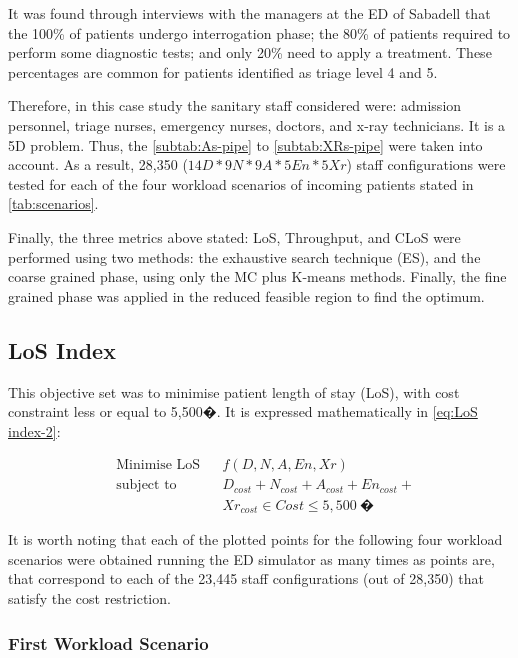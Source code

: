 It was found through interviews with the managers at the ED of Sabadell
that the 100\% of patients undergo interrogation phase; the 80\% of
patients required to perform some diagnostic tests; and only 20\%
need to apply a treatment. These percentages are common for patients
identified as triage level 4 and 5.

Therefore, in this case study the sanitary staff considered were:
admission personnel, triage nurses, emergency nurses, doctors, and
x-ray technicians. It is a 5D problem. Thus, the \ref{subtab:As-pipe}
to \ref{subtab:XRs-pipe} were taken into account. As a result, 28,350
($14D*9N*9A*5En*5Xr$) staff configurations were tested for each of
the four workload scenarios of incoming patients stated in \ref{tab:scenarios}. 

Finally, the three metrics above stated: LoS, Throughput, and CLoS
were performed using two methods: the exhaustive search technique
(ES), and the coarse grained phase, using only the MC plus K-means
methods. Finally, the fine grained phase was applied in the reduced
feasible region to find the optimum.


\subsection{LoS Index}

This objective set was to minimise patient length of stay (LoS), with
cost constraint less or equal to 5,500�. It is expressed mathematically
in \ref{eq:LoS index-2}:

\begin{equation}
\begin{aligned} & {\text{Minimise LoS}} &  & f(D,N,A,En,Xr)\\
 & \text{subject to} &  & D_{cost}+N_{cost}+A_{cost}+En_{cost}+\\
 &  &  & Xr_{cost}\in Cost\leq5,500\:\text{�}
\end{aligned}
\label{eq:LoS index-2}
\end{equation}


It is worth noting that each of the plotted points for the following
four workload scenarios were obtained running the ED simulator as
many times as points are, that correspond to each of the 23,445 staff
configurations (out of 28,350) that satisfy the cost restriction.

\clearpage{}


\subsubsection{First Workload Scenario}


